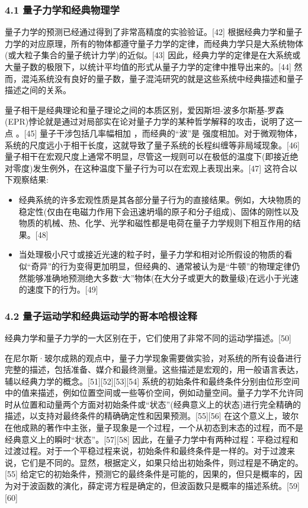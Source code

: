\subsubsection{4.1 量子力学和经典物理学}
量子力学的预测已经通过得到了非常高精度的实验验证。[42] 根据经典力学和量子力学的对应原理，所有的物体都遵守量子力学的定律，而经典力学只是大系统物体(或大粒子集合的量子统计力学)的近似。[43] 因此，经典力学的定律是在大系统或大量子数的极限下，以统计平均值的形式从量子力学的定律中推导出来的。[44] 然而，混沌系统没有良好的量子数，量子混沌研究的就是这些系统中经典描述和量子描述之间的关系。

量子相干是经典理论和量子理论之间的本质区别，爱因斯坦-波多尔斯基-罗森(EPR)悖论就是通过对局部实在论对量子力学的某种哲学解释的攻击，说明了这一点 。[45] 量子干涉包括几率幅相加 ，而经典的“波”是 强度相加。对于微观物体，系统的尺度远小于相干长度，这就导致了量子系统的长程纠缠等非局域现象。[46] 量子相干在宏观尺度上通常不明显，尽管这一规则可以在极低的温度下(即接近绝对零度)发生例外，在这种温度下量子行为可以在宏观上表现出来。[47] 这符合以下观察结果:
\begin{itemize}
\item 经典系统的许多宏观性质是其各部分量子行为的直接结果。例如，大块物质的稳定性(仅由在电磁力作用下会迅速坍塌的原子和分子组成)、固体的刚性以及物质的机械、热、化学、光学和磁性都是电荷在量子力学规则下相互作用的结果。[48]
\item 当处理极小尺寸或接近光速的粒子时，量子力学和相对论所假设的物质的看似“奇异”的行为变得更加明显，但经典的、通常被认为是“牛顿”的物理定律仍然能够准确地预测绝大多数“大”物体(在大分子或更大的数量级)在远小于光速的速度下的行为。[49]
\end{itemize}

\subsubsection{4.2 量子运动学和经典运动学的哥本哈根诠释}
经典力学和量子力学的一大区别在于，它们使用了非常不同的运动学描述。[50]

在尼尔斯·玻尔成熟的观点中，量子力学现象需要做实验，对系统的所有设备进行完整的描述，包括准备、媒介和最终测量。这些描述是宏观的，用一般语言表达，辅以经典力学的概念。[51][52][53][54] 系统的初始条件和最终条件分别由位形空间中的值来描述，例如位置空间或一些等价空间，例如动量空间。量子力学不允许同时从位置和动量两个方面对初始条件或“状态”(经典意义上的状态)进行完全精确的描述，以支持对最终条件的精确确定性和因果预测。[55][56] 在这个意义上，玻尔在他成熟的著作中主张，量子现象是一个过程，一个从初态到末态的过程，而不是经典意义上的瞬时“状态”。[57][58] 因此，在量子力学中有两种过程：平稳过程和过渡过程。对于一个平稳过程来说，初始条件和最终条件是一样的。对于过渡来说，它们是不同的。显然，根据定义，如果只给出初始条件，则过程是不确定的。[55] 给定它的初始条件，预测它的最终条件是可能的，因果的，但只是概率的，因为对于波函数的演化，薛定谔方程是确定的，但波函数只是概率的描述系统。[59][60]

